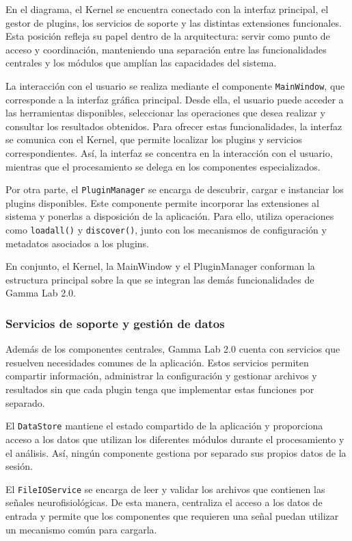 \documentclass[11pt,a4paper]{article}
\DeclareRobustCommand{\_}{\textunderscore\allowbreak}
\begin{document}
En el diagrama, el Kernel se encuentra conectado con la interfaz principal, el gestor de plugins, los servicios de soporte y las distintas extensiones funcionales. Esta posición refleja su papel dentro de la arquitectura: servir como punto de acceso y coordinación, manteniendo una separación entre las funcionalidades centrales y los módulos que amplían las capacidades del sistema.

La interacción con el usuario se realiza mediante el componente \texttt{MainWindow}, que corresponde a la interfaz gráfica principal. Desde ella, el usuario puede acceder a las herramientas disponibles, seleccionar las operaciones que desea realizar y consultar los resultados obtenidos. Para ofrecer estas funcionalidades, la interfaz se comunica con el Kernel, que permite localizar los plugins y servicios correspondientes. Así, la interfaz se concentra en la interacción con el usuario, mientras que el procesamiento se delega en los componentes especializados.

Por otra parte, el \texttt{PluginManager} se encarga de descubrir, cargar e instanciar los plugins disponibles. Este componente permite incorporar las extensiones al sistema y ponerlas a disposición de la aplicación. Para ello, utiliza operaciones como \texttt{load\_all()} y \texttt{discover()}, junto con los mecanismos de configuración y metadatos asociados a los plugins.

En conjunto, el Kernel, la MainWindow y el PluginManager conforman la estructura principal sobre la que se integran las demás funcionalidades de Gamma Lab 2.0.

\subsubsection{Servicios de soporte y gestión de datos}

Además de los componentes centrales, Gamma Lab 2.0 cuenta con servicios que resuelven necesidades comunes de la aplicación. Estos servicios permiten compartir información, administrar la configuración y gestionar archivos y resultados sin que cada plugin tenga que implementar estas funciones por separado.

El \texttt{DataStore} mantiene el estado compartido de la aplicación y proporciona acceso a los datos que utilizan los diferentes módulos durante el procesamiento y el análisis. Así, ningún componente gestiona por separado sus propios datos de la sesión.

El \texttt{FileIOService} se encarga de leer y validar los archivos que contienen las señales neurofisiológicas. De esta manera, centraliza el acceso a los datos de entrada y permite que los componentes que requieren una señal puedan utilizar un mecanismo común para cargarla.
\end{document}

